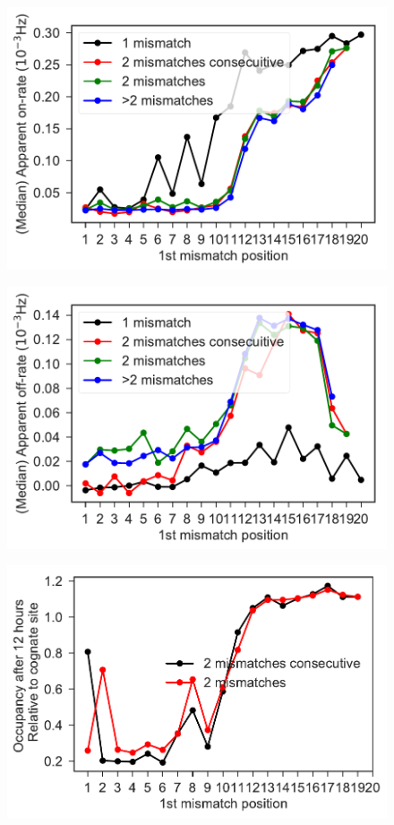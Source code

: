 \documentclass[a4paper,twoside]{revtex4-1}
\begin{document}
\begin{figure}[H]
\includegraphics[scale=0.5]{fig1_10_10_2018.pdf}
\end{figure}

\begin{figure}[H]
\includegraphics[scale=0.5]{fig2_10_10_2018.pdf}
\end{figure}

\begin{figure}[H]
\includegraphics[scale=0.5]{fig3_10_10_2018.pdf}
\end{figure}
\end{document}
